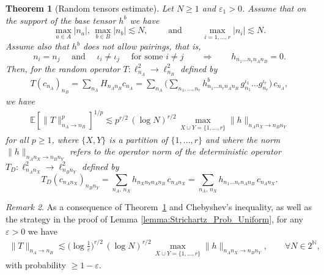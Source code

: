 \documentclass[11pt, xcolor = dvipsnames,reqno
]{amsart}
\newtheorem{thm}{Theorem}[section]
\theoremstyle{definition}
\theoremstyle{remark}
\newtheorem{rmk}[thm]{Remark}
\begin{document}
\begin{thm}[Random tensors estimate]\label{thm:Random_Tensor}
    Let $N \geq 1$ and $\varepsilon_1 > 0$. Assume that on the support of the base tensor $h^b$ we have 
    \begin{equation}
        \max_{a \in A}|n_a|, \,  \max_{b \in B} |n_b| \lesssim N, 
        \qquad \text{ and } \qquad 
        \max_{i=1, \ldots, r}|n_i| \lesssim N. 
    \end{equation}
    Assume also that $h^b$ does not allow pairings, that is, 
    \begin{equation*}
        n_i = n_j
        \quad \text{ and } \quad 
        \iota_i \neq \iota_j
        \quad \text{ for some } i \neq j
        \qquad \Longrightarrow \qquad h_{n_1\ldots n_rn_An_B} = 0. 
    \end{equation*}
    Then, for the random operator $T: \ell^2_{n_A} \to \ell^2_{n_B}$ defined by 
    \begin{align*}
        T(c_{n_A})_{n_B} 
        = \sum_{n_A} H_{n_An_B} c_{n_A}
        = \sum_{n_A} \Big( \sum_{n_1, \ldots, n_r} h^b_{n_1\ldots n_r n_A n_B} \, g_{n_1}^{\iota_1} \ldots g_{n_r}^{\iota_r} \Big)\, c_{n_A} 
        ,
    \end{align*}
    we have
    \begin{align}
        \mathbb E \left[\lVert T \rVert_{n_A \to n_B}^p
        \right]^{1/p}
        \lesssim
        p^{r/2} \, (\log N)^{r/2} \, 
        \max_{X \dot\cup Y = \{1, \ldots, r\}} \lVert h \rVert_{n_An_X \to n_Bn_Y}
    \end{align}
    for all $p \geq 1$, 
    where $\{X, Y\}$ is a partition of $\{1, \ldots, r\}$
    and where the norm $\lVert h \rVert_{n_An_X \to n_Bn_Y}$ refers to the operator norm of the deterministic operator $T_D:\ell^2_{n_An_X} \to \ell^2_{n_Bn_Y}$ defined by 
    \begin{equation*}
        T_D(c_{n_An_X})_{n_Bn_Y} = \sum_{n_A, \,  n_X} h_{n_Xn_Yn_An_B} \, c_{n_An_X}
        = \sum_{n_A, \,  n_X} h_{n_1 \ldots n_r n_An_B} \, c_{n_An_X}.
    \end{equation*}
\end{thm}
\begin{rmk}
As a consequence of Theorem~\ref{thm:Random_Tensor} and Chebyshev's inequality, as well as the strategy in the proof of Lemma \ref{lemma:Strichartz_Prob_Uniform}, 
for any $\varepsilon > 0$ we have 
    \begin{align}\label{eq:Random_Tensor_pointwise}
        \lVert T \rVert_{n_A \to n_B} 
        \lesssim \Big(\log \frac{1}{\varepsilon}\Big)^{r/2} \, (\log N)^{r/2} \, 
        \max_{X \dot\cup Y = \{1, \ldots, r\}} \lVert h \rVert_{n_An_X \to n_Bn_Y}, 
        \qquad \forall N \in 2^{\mathbb N}, 
    \end{align}
with probability $\geq 1-\varepsilon$. 
\end{rmk}
\end{document}
